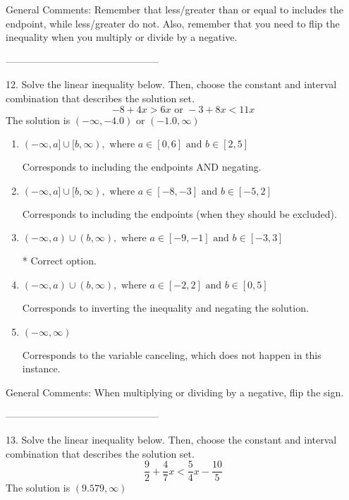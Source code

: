 \documentclass{article}[14pt]
\begin{document}
General Comments: Remember that less/greater than or equal to includes the endpoint, while less/greater do not. Also, remember that you need to flip the inequality when you multiply or divide by a negative.

-----------------------------------------------

12. Solve the linear inequality below. Then, choose the constant and interval combination that describes the solution set.
$$ -8 + 4 x > 6 x \text{ or } -3 + 8 x < 11 x $$ 
The solution is $ (-\infty, -4.0) \text{ or } (-1.0, \infty) $ 

\begin{enumerate}[label=\Alph*.] 
\item $ (-\infty, a] \cup [b, \infty), \text{ where } a \in [0, 6] \text{ and } b \in [2, 5] $ 

 Corresponds to including the endpoints AND negating. 
\item $ (-\infty, a] \cup [b, \infty), \text{ where } a \in [-8, -3] \text{ and } b \in [-5, 2] $ 

 Corresponds to including the endpoints (when they should be excluded). 
\item $ (-\infty, a) \cup (b, \infty), \text{ where } a \in [-9, -1] \text{ and } b \in [-3, 3] $ 

  * Correct option. 
\item $ (-\infty, a) \cup (b, \infty), \text{ where } a \in [-2, 2] \text{ and } b \in [0, 5] $ 

 Corresponds to inverting the inequality and negating the solution. 
\item $ (-\infty, \infty) $ 

 Corresponds to the variable canceling, which does not happen in this instance. 
\end{enumerate} 
 
General Comments: When multiplying or dividing by a negative, flip the sign.

-----------------------------------------------

13. Solve the linear inequality below. Then, choose the constant and interval combination that describes the solution set.
$$ \frac{9}{2} + \frac{4}{7} x < \frac{5}{4} x - \frac{10}{5} $$ 
The solution is $ (9.579, \infty) $ 
\end{document}
